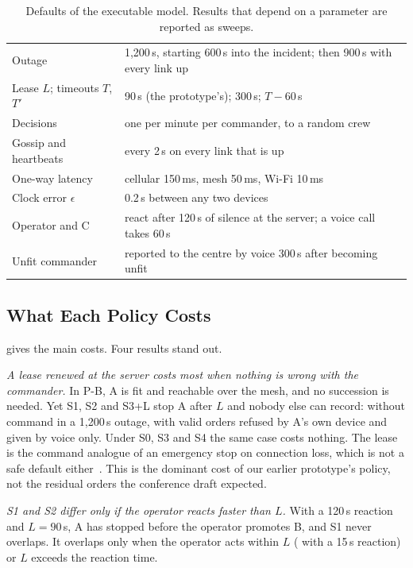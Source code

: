 \begin{table}[t]
\caption{Defaults of the executable model. Results that depend on a parameter are reported
as sweeps.}
\label{tab:params}
\footnotesize
\begin{tabular}{@{}ll@{}}
\toprule
Outage & 1{,}200\,s, starting 600\,s into the incident; then 900\,s with every link up \\
Lease $L$; timeouts $T$, $T'$ & 90\,s (the prototype's); 300\,s; $T - 60$\,s \\
Decisions & one per minute per commander, to a random crew \\
Gossip and heartbeats & every 2\,s on every link that is up \\
One-way latency & cellular 150\,ms, mesh 50\,ms, Wi-Fi 10\,ms \\
Clock error $\epsilon$ & 0.2\,s between any two devices \\
Operator and C & react after 120\,s of silence at the server; a voice call takes 60\,s \\
Unfit commander & reported to the centre by voice 300\,s after becoming unfit \\
\bottomrule
\end{tabular}
\end{table}

\subsection{What Each Policy Costs}
\label{sec:eval-costs}

 gives the main costs. Four results stand out.

\textit{A lease renewed at the server costs most when nothing is wrong with the commander.}
In P-B, A is fit and reachable over the mesh, and no succession is needed. Yet S1, S2 and
S3+L stop A after $L$ and nobody else can record: \tbPBNoCommand{} without command in a
1{,}200\,s outage, with \tbPBRefused{} valid orders refused by A's own device and given by
voice only. Under S0, S3 and S4 the same case costs nothing. The lease is the command
analogue of an emergency stop on connection loss, which is not a safe default
either~\cite{brettin2025blindspot}. This is the dominant cost of our earlier prototype's
policy, not the residual orders the conference draft expected.

\textit{S1 and S2 differ only if the operator reacts faster than $L$.} With a 120\,s
reaction and $L = 90$\,s, A has stopped before the operator promotes B, and S1 never
overlaps. It overlaps only when the operator acts within $L$ (\tbSOneOverlapFast{} with a
15\,s reaction) or $L$ exceeds the reaction time.

